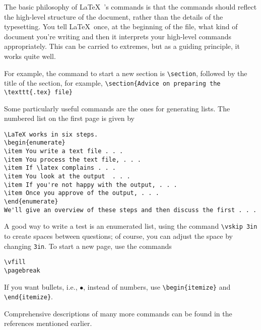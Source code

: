 \documentclass[12pt]{article}
\newcommand{\latex}{\LaTeX\ }
\begin{document}
The basic philosophy of \latex's commands is that the commands should
reflect the high-level structure of the document, rather than the
details of the typesetting.
You tell \latex once, at the beginning of the file, what kind of document
you're writing and then it interprets your high-level commands appropriately.
This can be carried to extremes, but as a guiding principle, it works
quite well.

For example, the command to start a new section is \verb+\section+,
followed by the title of the section, for example,
\verb+\section{Advice on preparing the \texttt{.tex} file}+

Some particularly useful commands are the ones for generating lists.
The numbered list on the first page is given by

\begin{verbatim}
\LaTeX works in six steps.
\begin{enumerate}
\item You write a text file . . . 
\item You process the text file, . . . 
\item If \latex complains . . . 
\item You look at the output  . . . 
\item If you're not happy with the output, . . . 
\item Once you approve of the output, . . . 
\end{enumerate}
We'll give an overview of these steps and then discuss the first . . .
\end{verbatim}

A good way to write a test is an enumerated list, using the command
\verb~\vskip 3in~ to create spaces between questions; of course,
you can adjust the space by changing \texttt{3in}.
To start a new page, use the commands
\begin{verbatim}
\vfill
\pagebreak
\end{verbatim}
If you want bullets, i.e., $\bullet$, instead of numbers, use
\verb~\begin{itemize}~ and \verb~\end{itemize}~.

Comprehensive descriptions of many more commands can be found in the 
references mentioned earlier.
\end{document}
